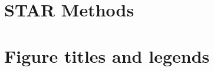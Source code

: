\documentclass[\cellsize, letterpaper]{article}
\begin{document}
\clearpage
\section{STAR Methods}




\ifcellpreprint\else
  \section{Figure titles and legends}
\fi
\end{document}
